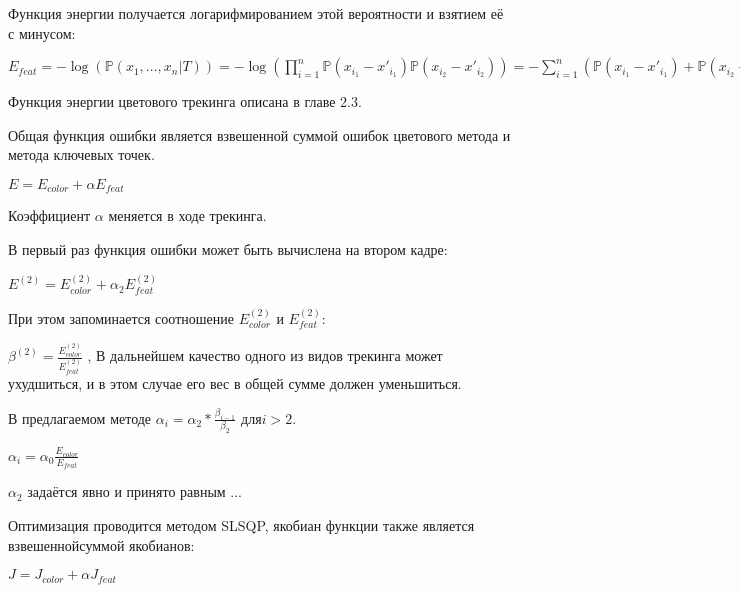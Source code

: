 Функция энергии получается логарифмированием этой вероятности и взятием её с
минусом:

$
    E_{feat} =
        - \log(\mathbb{P}(x_1, ..., x_n | T)) = 
- \log(\prod\limits_{i = 1}^n \mathbb{P}(x_{i_1} - x'_{i_1})
\mathbb{P}(x_{i_2}- x'_{i_2})) = - \sum\limits_{i = 1}^{n}( \mathbb{P}(x_{i_1}
- x'_{i_1}) +
\mathbb{P}(x_{i_2} - x'_{i_2}))
$

Функция энергии цветового трекинга описана в главе 2.3. %

Общая функция ошибки является взвешенной суммой ошибок цветового метода и
метода ключевых точек. 

$E = E_{color} + \alpha E_{feat}$

Коэффициент $\alpha$ меняется в ходе трекинга.

В первый раз функция ошибки может быть вычислена на втором кадре:

$E^{(2)} = E_{color}^{(2)} + \alpha_2 E_{feat}^{(2)}$

При этом запоминается соотношение $E_{color}^{(2)}$ и $E_{feat}^{(2)}$:

$\beta^{(2)} = \frac{E_{color}^{(2)}}{E_{feat}^{(2)}}$
,
В дальнейшем качество одного из видов трекинга может ухудшиться, и в этом
случае его вес в общей сумме должен уменьшиться.

В предлагаемом методе $\alpha_i = \alpha_2 * \frac{\beta_{i - 1}}{\beta_2}$
для$i > 2$.

$\alpha_i = \alpha_0 \frac{E_{color}}{E_{feat}}$

$\alpha_2$ задаётся явно и принято равным ...

Оптимизация проводится методом SLSQP, якобиан функции также является
взвешеннойсуммой якобианов:

$J = J_{color} + \alpha J_{feat}$
